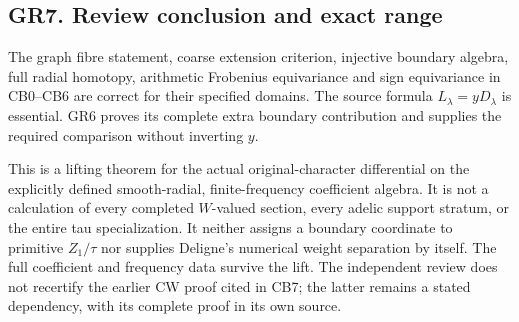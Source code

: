 \subsection{GR7. Review conclusion and exact
range}\label{gr7.-review-conclusion-and-exact-range}

The graph fibre statement, coarse extension criterion, injective
boundary algebra, full radial homotopy, arithmetic Frobenius
equivariance and sign equivariance in CB0--CB6 are correct for their
specified domains. The source formula \(L_\lambda=yD_\lambda\) is
essential. GR6 proves its complete extra boundary contribution and
supplies the required comparison without inverting \(y\).

This is a lifting theorem for the actual original-character differential
on the explicitly defined smooth-radial, finite-frequency coefficient
algebra. It is not a calculation of every completed \(W\)-valued
section, every adelic support stratum, or the entire tau specialization.
It neither assigns a boundary coordinate to primitive \(Z_1/\tau\) nor
supplies Deligne's numerical weight separation by itself. The full
coefficient and frequency data survive the lift. The independent review
does not recertify the earlier CW proof cited in CB7; the latter remains
a stated dependency, with its complete proof in its own source.
